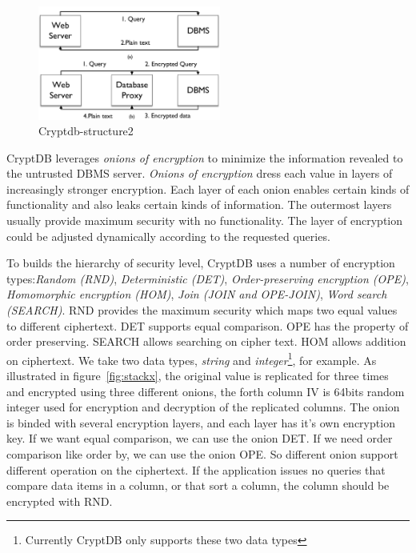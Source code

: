 \begin{figure}[tb]
\centering
\includegraphics[width=6cm]{images/Cryptdb-structure2.pdf}
\caption{Cryptdb-structure2}
\label{fig:stack1}
\end{figure}



CryptDB leverages \emph{onions of encryption} to minimize the information revealed to the untrusted DBMS server. 
\emph{Onions of encryption} dress each value in layers of increasingly stronger encryption. 
Each layer of each onion enables certain kinds of functionality and also leaks certain kinds of information.
The outermost layers usually provide maximum security with no functionality.
The layer of encryption could be adjusted dynamically according to the requested queries. 

To builds the hierarchy of security level, CryptDB uses a number of encryption types:\textit{Random (RND)}, \textit{Deterministic (DET)}, \textit{Order-preserving encryption (OPE)}, \textit{Homomorphic encryption (HOM)}, \textit{Join (JOIN and OPE-JOIN)}, \textit{Word search (SEARCH)}.
RND provides the maximum security which maps two equal values to different ciphertext. DET supports equal comparison. OPE has the property of order preserving. SEARCH allows searching on cipher text. HOM allows addition on ciphertext. We take two data types, \emph{string} and \emph{integer}\footnote{Currently CryptDB only supports these two data types}, for example. As illustrated in figure~\ref{fig:stackx}, the original value is replicated for three times and encrypted using three different onions, the forth column IV is 64bits random integer used for encryption and decryption of the replicated columns. The onion is binded with several encryption layers, and each layer has it's own encryption key. If we want equal comparison, we can use the onion DET. If we need order comparison like order by, we can use the onion OPE. So different onion support different operation on the ciphertext. If the application issues no queries that compare data items in a column, or that sort a column, the column should be encrypted with RND.


